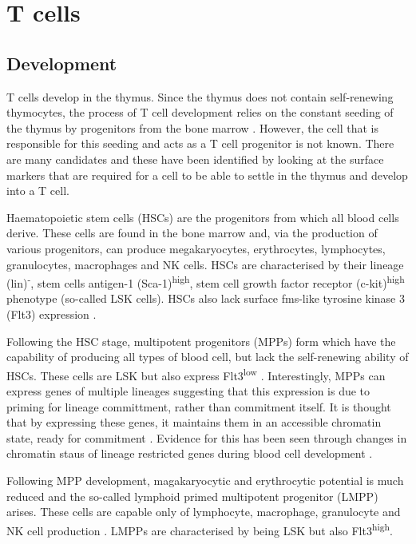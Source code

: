 \section{T cells}



\subsection{Development}
\label{subsec:Tcelldevelopment}

T cells develop in the thymus.
Since the thymus does not contain self-renewing thymocytes, the process of T cell development relies on the constant seeding of the thymus by progenitors from the bone marrow \citep{Zlotoff2011, Heinzel2007}.
However, the cell that is responsible for this seeding and acts as a T cell progenitor is not known.
There are many candidates and these have been identified by looking at the surface markers that are required for a cell to be able to settle in the thymus and develop into a T cell.

Haematopoietic stem cells (HSCs) are the progenitors from which all blood cells derive.
These cells are found in the bone marrow and, via the production of various progenitors, can produce megakaryocytes, erythrocytes, lymphocytes, granulocytes, macrophages and NK cells.
HSCs are characterised by their lineage (lin)\textsuperscript{-}, stem cells antigen-1 (Sca-1)\textsuperscript{high}, stem cell growth factor receptor (c-kit)\textsuperscript{high} phenotype (so-called LSK cells). HSCs also lack surface fms-like tyrosine kinase 3 (Flt3) expression \citep{Welinder2011}.

Following the HSC stage, multipotent progenitors (MPPs) form which have the capability of producing all types of blood cell, but lack the self-renewing ability of HSCs.
These cells are LSK but also express Flt3\textsuperscript{low} \citep{Welinder2011}.
Interestingly, MPPs can express genes of multiple lineages \citep{Hu1997} suggesting that this expression is due to priming for lineage committment, rather than commitment itself.
It is thought that by expressing these genes, it maintains them in an accessible chromatin state, ready for commitment \citep{Welinder2011}.
Evidence for this has been seen through changes in chromatin staus of lineage restricted genes during blood cell development \citep{Weishaupt2010}.

Following MPP development, magakaryocytic and erythrocytic potential is much reduced and the so-called lymphoid primed multipotent progenitor (LMPP) arises.
These cells are capable only of lymphocyte, macrophage, granulocyte and NK cell production \citep{Adolfsson2005}.
LMPPs are characterised by being LSK but also Flt3\textsuperscript{high}.

